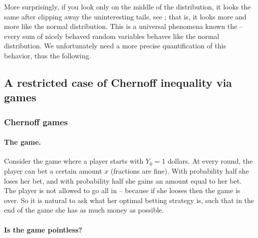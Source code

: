 More surprisingly, if you look only on the middle of the distribution,
it looks the same after clipping away the uninteresting tails, see
; that is, it looks more and more
like the normal distribution. This is a universal phenomena known the
 -- every sum of nicely behaved random
variables behaves like the normal distribution. We unfortunately need
a more precise quantification of this behavior, thus the following.








\subsection{A restricted case of Chernoff inequality via %
   games}
\subsubsection{Chernoff games}

\paragraph*{The game.}

Consider the game where a player starts with $Y_0=1$ dollars. At every
round, the player can bet a certain amount $x$ (fractions are
fine). With probability half she loses her bet, and with probability
half she gains an amount equal to her bet.  The player is not allowed
to go all in -- because if she looses then the game is over. So it is
natural to ask what her optimal betting strategy is, such that in the
end of the game she has as much money as possible.


\paragraph*{Is the game pointless?}

